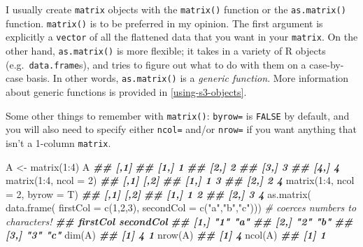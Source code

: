 \documentclass[
  12pt,
  krantz2]{krantz}
\makeatletter
\newenvironment{Shaded}{\begin{snugshade}}{\end{snugshade}}
\newcommand{\AttributeTok}[1]{\textcolor[rgb]{0.61,0.61,0.61}{#1}}
\newcommand{\CommentTok}[1]{\textcolor[rgb]{0.37,0.37,0.37}{\textit{#1}}}
\newcommand{\DecValTok}[1]{\textcolor[rgb]{0.06,0.06,0.06}{#1}}
\newcommand{\DocumentationTok}[1]{\textcolor[rgb]{0.37,0.37,0.37}{\textbf{\textit{#1}}}}
\newcommand{\FunctionTok}[1]{\textcolor[rgb]{0,0,0}{#1}}
\newcommand{\NormalTok}[1]{#1}
\newcommand{\OtherTok}[1]{\textcolor[rgb]{0.37,0.37,0.37}{#1}}
\newcommand{\SpecialCharTok}[1]{\textcolor[rgb]{0,0,0}{#1}}
\newcommand{\StringTok}[1]{\textcolor[rgb]{0.5,0.5,0.5}{#1}}
\newenvironment{kframe}{%
\medskip{}
\setlength{\fboxsep}{.8em}
 \def\at@end@of@kframe{}%
 \ifinner\ifhmode%
  \def\at@end@of@kframe{\end{minipage}}%
  \begin{minipage}{\columnwidth}%
 \fi\fi%
 \def\FrameCommand##1{\hskip\@totalleftmargin \hskip-\fboxsep
 \colorbox{shadecolor}{##1}\hskip-\fboxsep
     \hskip-\linewidth \hskip-\@totalleftmargin \hskip\columnwidth}%
 \MakeFramed {\advance\hsize-\width
   \@totalleftmargin\z@ \linewidth\hsize
   \@setminipage}}%
 {\par\unskip\endMakeFramed%
 \at@end@of@kframe}
\renewenvironment{Shaded}{\begin{kframe}}{\end{kframe}}
\makeatother
\begin{document}
I usually create \texttt{matrix} objects with the \texttt{matrix()} function or the \texttt{as.matrix()} function. \texttt{matrix()} is to be preferred in my opinion. The first argument is explicitly a \texttt{vector} of all the flattened data that you want in your \texttt{matrix}. On the other hand, \texttt{as.matrix()} is more flexible; it takes in a variety of R objects (e.g.~\texttt{data.frame}s), and tries to figure out what to do with them on a case-by-case basis. In other words, \texttt{as.matrix()} is a \emph{generic function}. More information about generic functions is provided in \ref{using-s3-objects}.

Some other things to remember with \texttt{matrix()}: \texttt{byrow=} is \texttt{FALSE} by default, and you will also need to specify either \texttt{ncol=} and/or \texttt{nrow=} if you want anything that isn't a 1-column \texttt{matrix}.

\begin{Shaded}
\begin{Highlighting}[]
\NormalTok{A }\OtherTok{\textless{}{-}} \FunctionTok{matrix}\NormalTok{(}\DecValTok{1}\SpecialCharTok{:}\DecValTok{4}\NormalTok{)}
\NormalTok{A}
\DocumentationTok{\#\#      [,1]}
\DocumentationTok{\#\# [1,]    1}
\DocumentationTok{\#\# [2,]    2}
\DocumentationTok{\#\# [3,]    3}
\DocumentationTok{\#\# [4,]    4}
\FunctionTok{matrix}\NormalTok{(}\DecValTok{1}\SpecialCharTok{:}\DecValTok{4}\NormalTok{, }\AttributeTok{ncol =} \DecValTok{2}\NormalTok{)}
\DocumentationTok{\#\#      [,1] [,2]}
\DocumentationTok{\#\# [1,]    1    3}
\DocumentationTok{\#\# [2,]    2    4}
\FunctionTok{matrix}\NormalTok{(}\DecValTok{1}\SpecialCharTok{:}\DecValTok{4}\NormalTok{, }\AttributeTok{ncol =} \DecValTok{2}\NormalTok{, }\AttributeTok{byrow =}\NormalTok{ T)}
\DocumentationTok{\#\#      [,1] [,2]}
\DocumentationTok{\#\# [1,]    1    2}
\DocumentationTok{\#\# [2,]    3    4}
\FunctionTok{as.matrix}\NormalTok{(}
  \FunctionTok{data.frame}\NormalTok{(}
    \AttributeTok{firstCol =} \FunctionTok{c}\NormalTok{(}\DecValTok{1}\NormalTok{,}\DecValTok{2}\NormalTok{,}\DecValTok{3}\NormalTok{),}
    \AttributeTok{secondCol =} \FunctionTok{c}\NormalTok{(}\StringTok{"a"}\NormalTok{,}\StringTok{"b"}\NormalTok{,}\StringTok{"c"}\NormalTok{))) }\CommentTok{\# coerces numbers to characters!}
\DocumentationTok{\#\#      firstCol secondCol}
\DocumentationTok{\#\# [1,] "1"      "a"      }
\DocumentationTok{\#\# [2,] "2"      "b"      }
\DocumentationTok{\#\# [3,] "3"      "c"}
\FunctionTok{dim}\NormalTok{(A)}
\DocumentationTok{\#\# [1] 4 1}
\FunctionTok{nrow}\NormalTok{(A)}
\DocumentationTok{\#\# [1] 4}
\FunctionTok{ncol}\NormalTok{(A)}
\DocumentationTok{\#\# [1] 1}
\end{Highlighting}
\end{Shaded}
\end{document}
